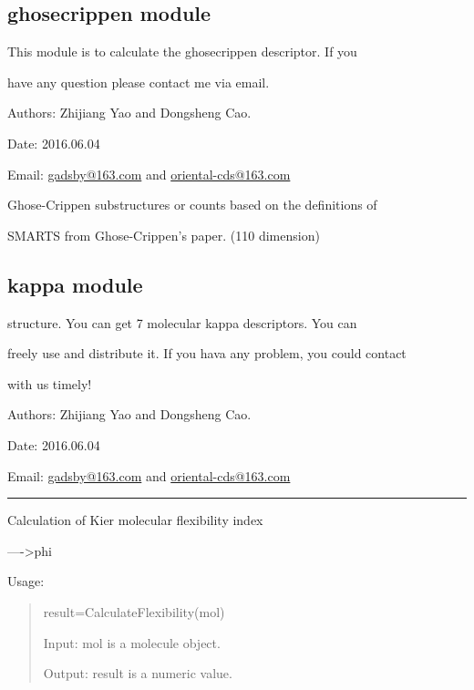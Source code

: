 \documentclass[letterpaper,10pt,english]{sphinxmanual}
\begin{document}
\subsection{ghosecrippen module}
\label{reference/ghosecrippen::doc}\label{reference/ghosecrippen:ghosecrippen-module}\label{reference/ghosecrippen:module-ghosecrippen}
This module is to calculate the ghosecrippen descriptor. If you

have any question please contact me via email.

Authors: Zhijiang Yao and Dongsheng Cao.

Date: 2016.06.04

Email: \href{mailto:gadsby@163.com}{gadsby@163.com} and \href{mailto:oriental-cds@163.com}{oriental-cds@163.com}

\begin{fulllineitems}
\label{reference/ghosecrippen:ghosecrippen.GhoseCrippenFingerprint}
Ghose-Crippen substructures or counts based on the definitions of

SMARTS from Ghose-Crippen's paper. (110 dimension)

\end{fulllineitems}



\subsection{kappa module}
\label{reference/kappa:module-kappa}\label{reference/kappa::doc}\label{reference/kappa:kappa-module}
structure. You can get 7 molecular kappa descriptors. You can

freely use and distribute it. If you hava  any problem, you could contact

with us timely!

Authors: Zhijiang Yao and Dongsheng Cao.

Date: 2016.06.04

Email: \href{mailto:gadsby@163.com}{gadsby@163.com} and \href{mailto:oriental-cds@163.com}{oriental-cds@163.com}


\bigskip\hrule{}\bigskip


\begin{fulllineitems}
\label{reference/kappa:kappa.CalculateFlexibility}
Calculation of Kier molecular flexibility index

----\textgreater{}phi

Usage:
\begin{quote}

result=CalculateFlexibility(mol)

Input: mol is a molecule object.

Output: result is a numeric value.
\end{quote}

\end{fulllineitems}
\end{document}
